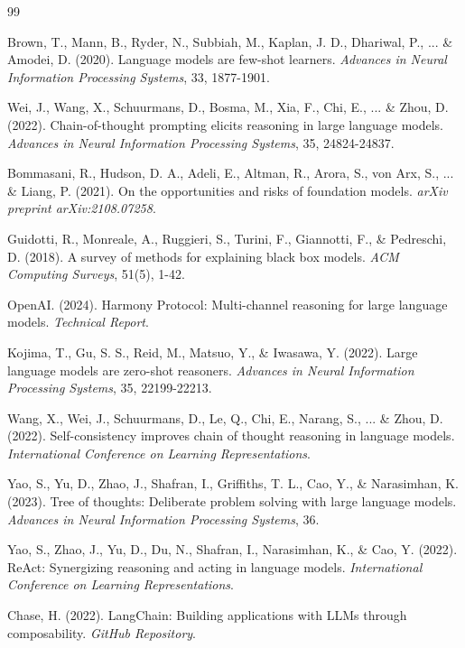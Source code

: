 \documentclass[11pt,a4paper]{article}
\begin{document}

\begin{thebibliography}{99}

Brown, T., Mann, B., Ryder, N., Subbiah, M., Kaplan, J. D., Dhariwal, P., ... \& Amodei, D. (2020).
Language models are few-shot learners.
\textit{Advances in Neural Information Processing Systems}, 33, 1877-1901.

Wei, J., Wang, X., Schuurmans, D., Bosma, M., Xia, F., Chi, E., ... \& Zhou, D. (2022).
Chain-of-thought prompting elicits reasoning in large language models.
\textit{Advances in Neural Information Processing Systems}, 35, 24824-24837.

Bommasani, R., Hudson, D. A., Adeli, E., Altman, R., Arora, S., von Arx, S., ... \& Liang, P. (2021).
On the opportunities and risks of foundation models.
\textit{arXiv preprint arXiv:2108.07258}.

Guidotti, R., Monreale, A., Ruggieri, S., Turini, F., Giannotti, F., \& Pedreschi, D. (2018).
A survey of methods for explaining black box models.
\textit{ACM Computing Surveys}, 51(5), 1-42.

OpenAI. (2024).
Harmony Protocol: Multi-channel reasoning for large language models.
\textit{Technical Report}.

Kojima, T., Gu, S. S., Reid, M., Matsuo, Y., \& Iwasawa, Y. (2022).
Large language models are zero-shot reasoners.
\textit{Advances in Neural Information Processing Systems}, 35, 22199-22213.

Wang, X., Wei, J., Schuurmans, D., Le, Q., Chi, E., Narang, S., ... \& Zhou, D. (2022).
Self-consistency improves chain of thought reasoning in language models.
\textit{International Conference on Learning Representations}.

Yao, S., Yu, D., Zhao, J., Shafran, I., Griffiths, T. L., Cao, Y., \& Narasimhan, K. (2023).
Tree of thoughts: Deliberate problem solving with large language models.
\textit{Advances in Neural Information Processing Systems}, 36.

Yao, S., Zhao, J., Yu, D., Du, N., Shafran, I., Narasimhan, K., \& Cao, Y. (2022).
ReAct: Synergizing reasoning and acting in language models.
\textit{International Conference on Learning Representations}.

Chase, H. (2022).
LangChain: Building applications with LLMs through composability.
\textit{GitHub Repository}.


\end{thebibliography}
\end{document}
